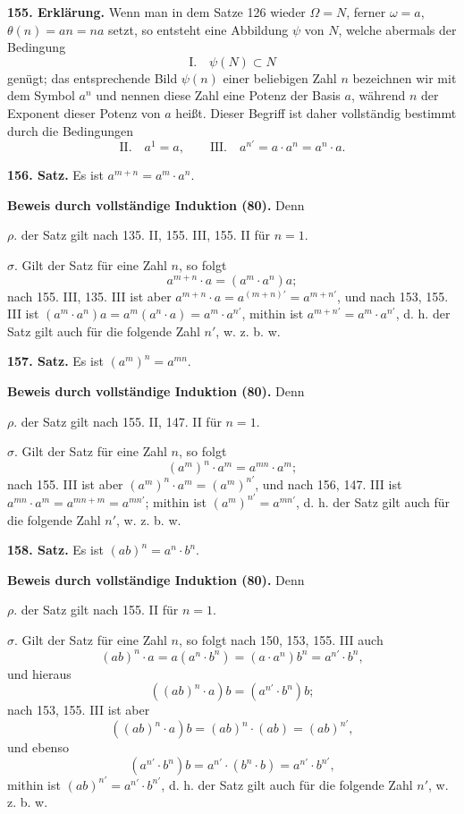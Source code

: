 \documentclass[11pt]{article}
\newcommand{\partof}{\mathrel{\subset}}
\begin{document}
\noindent\textbf{155. Erklärung.} Wenn man in dem Satze 126 wieder $\Omega=N$, ferner $\omega=a$, $\theta(n)=an=na$ setzt, so entsteht eine Abbildung $\psi$ von $N$, welche abermals der Bedingung
\[
\text{I.}\quad \psi(N)\partof N
\]
genügt; das entsprechende Bild $\psi(n)$ einer beliebigen Zahl $n$ bezeichnen wir mit dem Symbol $a^n$ und nennen diese Zahl eine Potenz der Basis $a$, während $n$ der Exponent dieser Potenz von $a$ heißt. Dieser Begriff ist daher vollständig bestimmt durch die Bedingungen
\[
\text{II.}\quad a^1=a,
\qquad
\text{III.}\quad a^{n'}=a\cdot a^n=a^n\cdot a.
\]

\noindent\textbf{156. Satz.} Es ist $a^{m+n}=a^m\cdot a^n$.

\noindent\textbf{Beweis durch vollständige Induktion (80).} Denn

\noindent $\rho.$ der Satz gilt nach 135. II, 155. III, 155. II für $n=1$.

\noindent $\sigma.$ Gilt der Satz für eine Zahl $n$, so folgt
\[
a^{m+n}\cdot a=(a^m\cdot a^n)a;
\]
nach 155. III, 135. III ist aber $a^{m+n}\cdot a=a^{(m+n)'}=a^{m+n'}$, und nach 153, 155. III ist $(a^m\cdot a^n)a=a^m(a^n\cdot a)=a^m\cdot a^{n'}$, mithin ist $a^{m+n'}=a^m\cdot a^{n'}$, d. h. der Satz gilt auch für die folgende Zahl $n'$, w. z. b. w.

\noindent\textbf{157. Satz.} Es ist $(a^m)^n=a^{mn}$.

\noindent\textbf{Beweis durch vollständige Induktion (80).} Denn

\noindent $\rho.$ der Satz gilt nach 155. II, 147. II für $n=1$.

\noindent $\sigma.$ Gilt der Satz für eine Zahl $n$, so folgt
\[
(a^m)^n\cdot a^m=a^{mn}\cdot a^m;
\]
nach 155. III ist aber $(a^m)^n\cdot a^m=(a^m)^{n'}$, und nach 156, 147. III ist $a^{mn}\cdot a^m=a^{mn+m}=a^{mn'}$; mithin ist $(a^m)^{n'}=a^{mn'}$, d. h. der Satz gilt auch für die folgende Zahl $n'$, w. z. b. w.

\noindent\textbf{158. Satz.} Es ist $(ab)^n=a^n\cdot b^n$.

\noindent\textbf{Beweis durch vollständige Induktion (80).} Denn

\noindent $\rho.$ der Satz gilt nach 155. II für $n=1$.

\noindent $\sigma.$ Gilt der Satz für eine Zahl $n$, so folgt nach 150, 153, 155. III auch
\[
(ab)^n\cdot a=a(a^n\cdot b^n)=(a\cdot a^n)b^n=a^{n'}\cdot b^n,
\]
und hieraus
\[
((ab)^n\cdot a)b=(a^{n'}\cdot b^n)b;
\]
nach 153, 155. III ist aber
\[
((ab)^n\cdot a)b=(ab)^n\cdot(ab)=(ab)^{n'},
\]
und ebenso
\[
(a^{n'}\cdot b^n)b=a^{n'}\cdot(b^n\cdot b)=a^{n'}\cdot b^{n'},
\]
mithin ist $(ab)^{n'}=a^{n'}\cdot b^{n'}$, d. h. der Satz gilt auch für die folgende Zahl $n'$, w. z. b. w.
\end{document}
